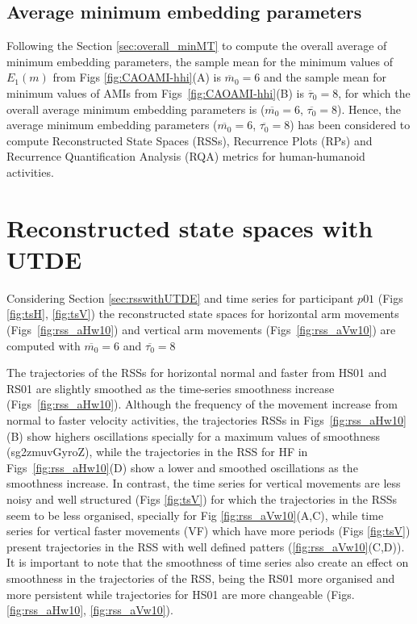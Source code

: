 \newpage
\subsection{Average minimum embedding parameters}
Following the Section \ref{sec:overall_minMT} to compute the overall average 
of minimum embedding parameters, the sample mean for the 
minimum values of $E_{1}(m)$ from Figs \ref{fig:CAOAMI-hhi}(A) 
is $\overline{m}_0=6$ and the sample 
mean for minimum values of AMIs from Figs~\ref{fig:CAOAMI-hhi}(B)
is $\overline{\tau}_0=8$, for which the overall average minimum embedding 
parameters is ($\overline{m_0}=6$, $\overline{\tau_0}=8$).
Hence, the average minimum embedding parameters 
($\overline{m_0}=6$, $\overline{\tau_0}=8$)
has been considered to compute 
Reconstructed State Spaces (RSSs), Recurrence Plots (RPs) and
Recurrence Quantification Analysis (RQA) metrics for human-humanoid activities.

\section{Reconstructed state spaces with UTDE}
Considering Section \ref{sec:rsswithUTDE} and time series for participant $p01$ 
(Figs \ref{fig:tsH}, \ref{fig:tsV}) the reconstructed state spaces
for horizontal arm movements (Figs~\ref{fig:rss_aHw10}) and
 vertical arm movements  (Figs~\ref{fig:rss_aVw10}) 
are computed with $\overline{m_0}=6$ and $\overline{\tau_0}=8$ 

The trajectories of the RSSs for horizontal normal and faster from 
HS01 and RS01 are slightly smoothed as the time-series 
smoothness increase (Figs~\ref{fig:rss_aHw10}). 
Although the frequency of the movement increase from normal to faster velocity
activities, the trajectories RSSs in Figs~\ref{fig:rss_aHw10}(B)
show highers oscillations specially for a maximum values of smoothness
(sg2zmuvGyroZ), while the trajectories in the RSS for HF in 
Figs~\ref{fig:rss_aHw10}(D) show a lower and smoothed oscillations 
as the smoothness increase.
In contrast, the time series for vertical movements are less noisy and 
well structured (Figs \ref{fig:tsV}) for which the trajectories in the RSSs 
seem to be less organised, specially for Fig \ref{fig:rss_aVw10}(A,C), 
while time series for vertical faster movements (VF) which have more 
periods (Figs \ref{fig:tsV}) present trajectories in the RSS with 
well defined patters (\ref{fig:rss_aVw10}(C,D)).
It is important to note that the smoothness of time series also create 
an effect on smoothness in the trajectories of the RSS, being the RS01 
more organised and more persistent while trajectories for HS01 are 
more changeable (Figs. \ref{fig:rss_aHw10}, \ref{fig:rss_aVw10}).

